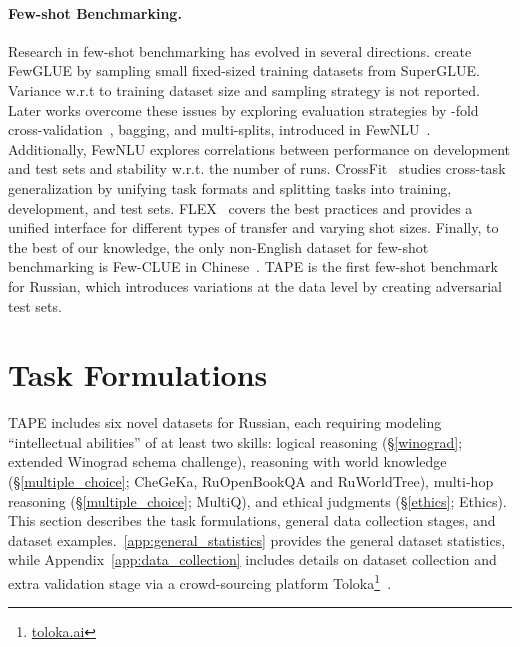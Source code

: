 \documentclass[11pt]{article}
\begin{document}
\paragraph{Few-shot Benchmarking.} Research in few-shot benchmarking has evolved in several directions. \citet{schick-schutze-2021-just} create FewGLUE by sampling small fixed-sized training datasets from SuperGLUE. Variance w.r.t to training dataset size and sampling strategy is not reported. Later works overcome these issues by exploring evaluation strategies by -fold cross-validation~\cite{perez2021true}, bagging, and multi-splits, introduced in FewNLU~\cite{zheng-etal-2022-fewnlu}. Additionally, FewNLU explores correlations between performance on development and test sets and stability w.r.t. the number of runs. CrossFit~\cite{ye-etal-2021-crossfit} studies cross-task generalization by unifying task formats and splitting tasks into training, development, and test sets. FLEX~\cite{bragg2021flex} covers the best practices and provides a unified interface for different types of transfer and varying shot sizes. Finally, to the best of our knowledge, the only non-English dataset for few-shot benchmarking is Few-CLUE in Chinese~\cite{xu2021fewclue}. TAPE is the first few-shot benchmark for Russian, which introduces variations at the data level by creating adversarial test sets. 

 

\section{Task Formulations}
\label{sec:task_formulation}
TAPE includes six novel datasets for Russian, each requiring modeling ``intellectual abilities'' of at least two skills: logical reasoning (\S\ref{winograd}; extended Winograd schema challenge), reasoning with world knowledge (\S\ref{multiple_choice}; CheGeKa, RuOpenBookQA and RuWorldTree), multi-hop reasoning (\S\ref{multiple_choice}; MultiQ), and ethical judgments (\S\ref{ethics}; Ethics). This section describes the task formulations, general data collection stages, and dataset examples.~\autoref{app:general_statistics} provides the general dataset statistics, while Appendix~\ref{app:data_collection} includes details on dataset collection and extra validation stage via a crowd-sourcing platform Toloka\footnote{\href{https://toloka.ai/}{toloka.ai}}~\cite{toloka}.
\end{document}
